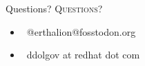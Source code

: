 \documentclass[usenames,dvipsnames, 18pt, compress, aspectratio=169]{beamer}
\def\social{{\faMastodon}}
\def\email{{\faEnvelope}}
\begin{document}
\fontsize{18pt}{18}\selectfont
\begin{frame}
  \vspace*{2.5cm}
  \begin{minipage}[b][\paperheight]{\textwidth}
  \begin{center}

      \linespread{1.0}%
      \if@noSmallCapitals%
        Questions?
      \else%
        \scshape{\color{black} Questions?}%
      \fi%
      \vspace*{0.3em}

      \fontsize{13pt}{14}\selectfont
        \begin{itemize}[label={}]
            \item {\color{black} \social\ @erthalion@fosstodon.org}
            \item {\color{black} \email\ ddolgov at redhat dot com}
        \end{itemize}
      \vspace*{2.5em}%

    \vfill
    \vspace*{2em}
  \end{center}
  \end{minipage}

\end{frame}
\end{document}

